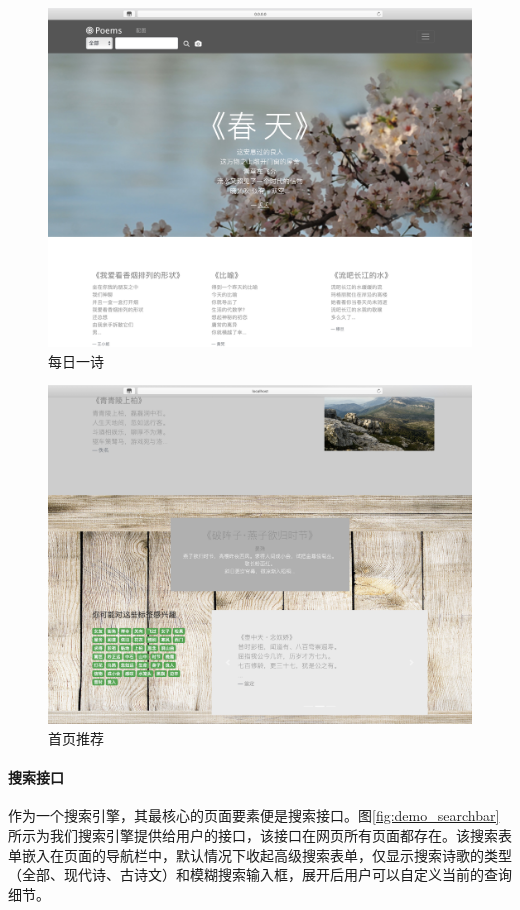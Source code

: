 \documentclass[a4paper, 10pt]{article}
\begin{document}
\begin{figure}[H]
\centering
\includegraphics[width=1.0\linewidth]{fig/landing1.jpg}
\caption{每日一诗}
\label{fig:landing1}
\end{figure}
\begin{figure}[H]
\centering
\includegraphics[width=1.0\linewidth]{fig/landing2.jpg}
\caption{首页推荐}
\label{fig:landing2}
\end{figure}

\paragraph*{搜索接口} 作为一个搜索引擎，其最核心的页面要素便是搜索接口。图\ref{fig:demo_searchbar}所示为我们搜索引擎提供给用户的接口，该接口在网页所有页面都存在。该搜索表单嵌入在页面的导航栏中，默认情况下收起高级搜索表单，仅显示搜索诗歌的类型（全部、现代诗、古诗文）和模糊搜索输入框，展开后用户可以自定义当前的查询细节。
\end{document}
